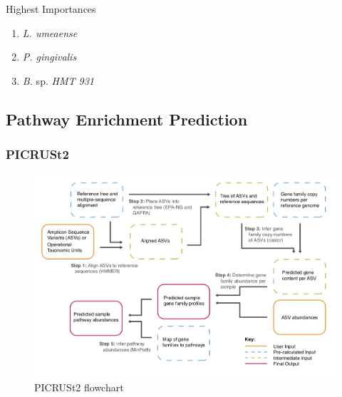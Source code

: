 \documentclass{beamer}
\begin{document}
\begin{frame}[allowframebreaks]
        \begin{block}{Highest Importances}
            \begin{enumerate}
                \item \textit{L. umeaense}
                \item \textit{P. gingivalis}
                \item \textit{B.} sp. \textit{HMT 931}
            \end{enumerate}
        \end{block}
    \end{frame}

    \subsection{Pathway Enrichment Prediction}
    \begin{frame}
        \frametitle{PICRUSt2}

        \begin{figure}
            \includegraphics[width=0.8 \linewidth]{figures/PICRUSt2.png}
            \caption{PICRUSt2 flowchart \protect\cite{PICRUSt2-1}}
        \end{figure}
    \end{frame}
\end{document}
